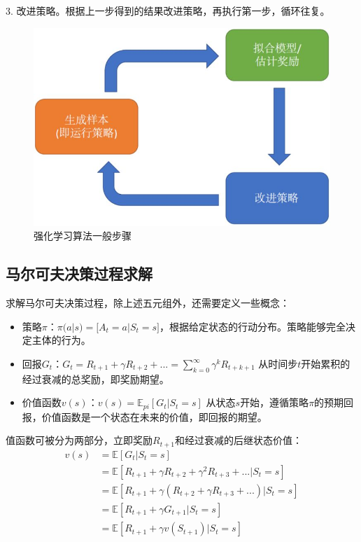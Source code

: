 3. 改进策略。根据上一步得到的结果改进策略，再执行第一步，循环往复。
\begin{figure}[!htbp]\centering
\vspace{1em}
  \includegraphics[width=0.6\linewidth]{figures/RL_process.jpg}
  \caption{强化学习算法一般步骤} 
  \label{fig:RL_process}       %
  \vspace{1em}
\end{figure}

\subsection{马尔可夫决策过程求解}
求解马尔可夫决策过程，除上述五元组外，还需要定义一些概念：
\begin{itemize}
\item 策略$\pi$：$\pi(a|s)=\mathbb[A_t=a|S_t=s]$，根据给定状态的行动分布。策略能够完全决定主体的行为。
\item 回报$G_t$：$G_t = R_{t+1} + \gamma R_{t+2} + ... = \sum_{k=0}^\infty \gamma^kR_{t+k+1}$ 从时间步$t$开始累积的经过衰减的总奖励，即奖励期望。
\item 价值函数$v(s)$：$v(s)=\mathbb{E}_{pi}[G_t|S_t=s]$ 从状态$s$开始，遵循策略$\pi$的预期回报，价值函数是一个状态在未来的价值，即回报的期望。
\end{itemize}
值函数可被分为两部分，立即奖励$R_{t+1}$和经过衰减的后继状态价值：
\begin{equation}\label{eq:Bellman}
\begin{aligned}
v(s) & = \mathbb{E}[G_t|S_t = s] \\
     & = \mathbb{E}[R_{t+1} + \gamma R_{t+2} + \gamma^2 R_{t+3}+...|S_t=s]\\
     & = \mathbb{E}[R_{t+1} + \gamma(R_{t+2} + \gamma R_{t+3}+...)|S_t=s]\\
     & = \mathbb{E}[R_{t+1} + \gamma G_{t+1}|S_t=s]\\
     & = \mathbb{E}[R_{t+1} + \gamma v(S_{t+1})|S_t=s]\\
\end{aligned}
\end{equation}

